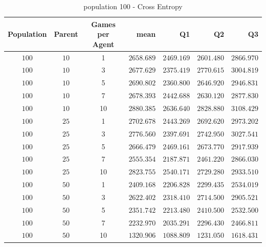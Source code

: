 \begin{table}[H]
\centering
\small
\begin{tabular}{c c c r r r r}
Population & Parent & Games per Agent & mean & Q1 & Q2 & Q3\\
\hline
$100$ & $10$ & 1 & $2658.689$ & $2469.169$ & $2601.480$ & $2866.970$\\
$100$ & $10$ & 3 & $2677.629$ & $2375.419$ & $2770.615$ & $3004.819$\\
$100$ & $10$ & 5 & $2690.802$ & $2360.800$ & $2646.920$ & $2946.831$\\
$100$ & $10$ & 7 & $2678.393$ & $2442.688$ & $2630.120$ & $2877.830$\\
\hdashline
$100$ & $10$ & 10 & $2880.385$ & $2636.640$ & $2828.880$ & $3108.429$\\
\hdashline
$100$ & $25$ & 1 & $2702.678$ & $2443.269$ & $2692.620$ & $2973.202$\\
\hdashline
$100$ & $25$ & 3 & $2776.560$ & $2397.691$ & $2742.950$ & $3027.541$\\
\hdashline
$100$ & $25$ & 5 & $2666.479$ & $2469.161$ & $2673.770$ & $2917.939$\\
$100$ & $25$ & 7 & $2555.354$ & $2187.871$ & $2461.220$ & $2866.030$\\
$100$ & $25$ & 10 & $2823.755$ & $2540.171$ & $2729.280$ & $2933.510$\\
$100$ & $50$ & 1 & $2409.168$ & $2206.828$ & $2299.435$ & $2534.019$\\
\hdashline
$100$ & $50$ & 3 & $2622.402$ & $2318.410$ & $2714.500$ & $2905.521$\\
\hdashline
$100$ & $50$ & 5 & $2351.742$ & $2213.480$ & $2410.500$ & $2532.500$\\
$100$ & $50$ & 7 & $2232.970$ & $2035.291$ & $2296.430$ & $2466.811$\\
$100$ & $50$ & 10 & $1320.906$ & $1088.809$ & $1231.050$ & $1618.431$\\
\end{tabular}
\caption{population 100 - Cross Entropy}
\end{table}


